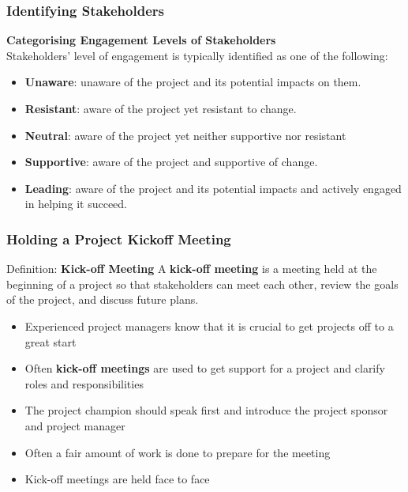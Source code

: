 \documentclass{beamer}
\begin{document}
\begin{frame}
\frametitle{Identifying Stakeholders}
\textbf{Categorising Engagement Levels of Stakeholders}\\
\vspace{0.5cm}
Stakeholders' level of engagement is typically identified as one of the following:
\begin{itemize}
\item \textbf{Unaware}: unaware of the project and its potential impacts on them.
\item \textbf{Resistant}: aware of the project yet resistant to change.
\item \textbf{Neutral}: aware of the project yet neither supportive nor resistant
\item \textbf{Supportive}: aware of the project and supportive of change.
\item \textbf{Leading}: aware of the project and its potential impacts and actively engaged in helping it succeed.
\end{itemize}
\end{frame}

\begin{frame}
\frametitle{Holding a Project Kickoff Meeting}
\begin{block}{Definition: \textbf{Kick-off Meeting}}
A \textbf{kick-off meeting} is a meeting held at the beginning of a project so that stakeholders can meet each other, review the goals of the project, and discuss future plans.
\end{block}

\begin{itemize}
\item Experienced project managers know that it is crucial to get projects off to a great start
\item Often \textbf{kick-off meetings} are used to get support for a project and clarify roles and responsibilities
\item The project champion should speak first and introduce the project sponsor and project manager
\item Often a fair amount of work is done to prepare for the meeting
\item Kick-off meetings are held face to face
\end{itemize}
\end{frame}
\end{document}

